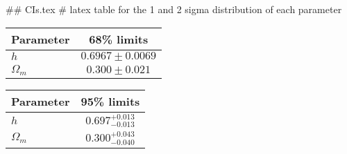 ## CIs.tex
# latex table for the 1 and 2 sigma distribution of each parameter

\begin{tabular} { l  c}
 Parameter &  68\% limits\\
\hline
{\boldmath$h              $} & $0.6967\pm 0.0069          $\\
{\boldmath$\Omega_m       $} & $0.300\pm 0.021            $\\
\hline
\end{tabular}

\begin{tabular} { l  c}
 Parameter &  95\% limits\\
\hline
{\boldmath$h              $} & $0.697^{+0.013}_{-0.013}   $\\
{\boldmath$\Omega_m       $} & $0.300^{+0.043}_{-0.040}   $\\
\hline
\end{tabular}
